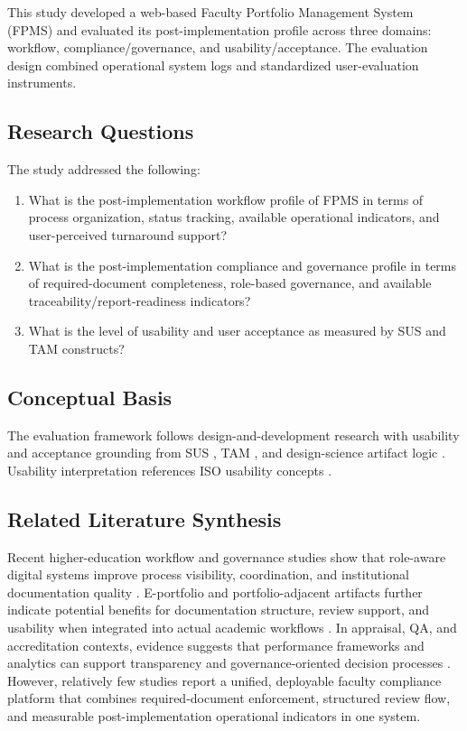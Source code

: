 \documentclass[conference]{IEEEtran}
\begin{document}
This study developed a web-based Faculty Portfolio Management System (FPMS) and evaluated its post-implementation profile across three domains: workflow, compliance/governance, and usability/acceptance. The evaluation design combined operational system logs and standardized user-evaluation instruments.

\subsection{Research Questions}
The study addressed the following:
\begin{enumerate}
    \item What is the post-implementation workflow profile of FPMS in terms of process organization, status tracking, available operational indicators, and user-perceived turnaround support?
    \item What is the post-implementation compliance and governance profile in terms of required-document completeness, role-based governance, and available traceability/report-readiness indicators?
    \item What is the level of usability and user acceptance as measured by SUS and TAM constructs?
\end{enumerate}

\subsection{Conceptual Basis}
The evaluation framework follows design-and-development research with usability and acceptance grounding from SUS \parencite{brooke1996sus}, TAM \parencite{davis1989tam}, and design-science artifact logic \parencite{hevner2004dsr}. Usability interpretation references ISO usability concepts \parencite{iso9241_11_2018}.

\subsection{Related Literature Synthesis}
Recent higher-education workflow and governance studies show that role-aware digital systems improve process visibility, coordination, and institutional documentation quality \parencite{reyes2023fedesk,ikwunne2021collaborativeManagement,fernandoRaguro2021smartUniversity,gutierrezYRestrepo2022inclusiveHEI,lee2023scholarlyProfile}. E-portfolio and portfolio-adjacent artifacts further indicate potential benefits for documentation structure, review support, and usability when integrated into actual academic workflows \parencite{tasatanattakool2023eportfolio,miyazaki2021genericSkill,gantikow2024conceptMaps,badouri2025medicalEportfolio}. In appraisal, QA, and accreditation contexts, evidence suggests that performance frameworks and analytics can support transparency and governance-oriented decision processes \parencite{zhao2024kpiAppraisal,vazquezNoguera2024aneaes,srija2025facultyAppraisal,balisi2025facultyRanking,zakaria2025lecturerInsights,sudha2025googleScholarMetrics,ozeki2021facultyDevelopment}. However, relatively few studies report a unified, deployable faculty compliance platform that combines required-document enforcement, structured review flow, and measurable post-implementation operational indicators in one system.
\end{document}
